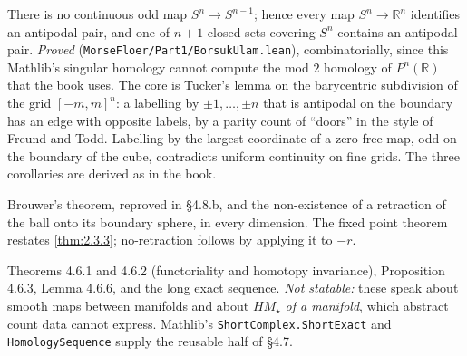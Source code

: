 \begin{theorem}
  \label{thm:4.8.3}
  \leanok
  There is no continuous odd map $S^n \to S^{n-1}$; hence every map
  $S^n\to\mathbb{R}^n$ identifies an antipodal pair, and one of $n+1$ closed
  sets covering $S^n$ contains an antipodal pair.  \emph{Proved}
  (\texttt{MorseFloer/Part1/BorsukUlam.lean}), combinatorially, since this
  Mathlib's singular homology cannot compute the mod $2$ homology of
  $P^n(\mathbb{R})$ that the book uses.  The core is Tucker's lemma on the
  barycentric subdivision of the grid $[-m,m]^n$: a labelling by
  $\pm1,\dots,\pm n$ that is antipodal on the boundary has an edge with opposite
  labels, by a parity count of ``doors'' in the style of Freund and Todd.
  Labelling by the largest coordinate of a zero-free map, odd on the boundary of
  the cube, contradicts uniform continuity on fine grids.  The three corollaries
  are derived as in the book.
\end{theorem}

\begin{theorem}
  \label{thm:4.8.b}
  \leanok
  Brouwer's theorem, reproved in \S4.8.b, and the non-existence of a retraction
  of the ball onto its boundary sphere, in every dimension.  The fixed point
  theorem restates \ref{thm:2.3.3}; no-retraction follows by applying it to
  $-r$.
\end{theorem}

\begin{theorem}
  \label{thm:4.6}
  \notready
  Theorems 4.6.1 and 4.6.2 (functoriality and homotopy invariance),
  Proposition 4.6.3, Lemma 4.6.6, and the long exact sequence.
  \emph{Not statable:} these speak about smooth maps between manifolds and about
  $HM_\star$ \emph{of a manifold}, which abstract count data cannot express.
  Mathlib's \texttt{ShortComplex.ShortExact} and \texttt{HomologySequence} supply
  the reusable half of \S4.7.
\end{theorem}

